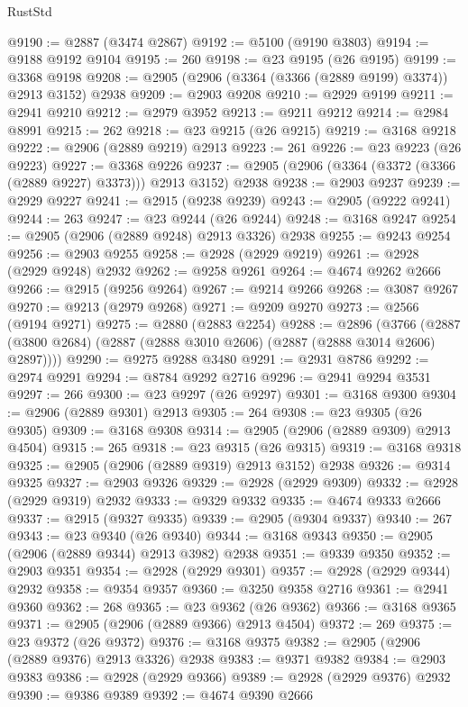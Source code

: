 \begin{lexlean}{RustStd}
\begin{coremodule}
{\begin{coremodule}
{{{{{{{{{{{{{{{{{{{{{{{{{{{{{{{{{{{{{{{{{{{{{{{{{{{{{{{{{{{{{{{{{{{{{{{{{{{{{{@9190 := @2887 (@3474 @2867)
@9192 := @5100 (@9190 @3803)
@9194 := @9188 @9192 @9104
@9195 := 260
@9198 := @23 @9195 (@26 @9195)
@9199 := @3368 @9198
@9208 := @2905 (@2906 (@3364 (@3366 (@2889 @9199) @3374)) @2913 @3152) @2938
@9209 := @2903 @9208
@9210 := @2929 @9199
@9211 := @2941 @9210
@9212 := @2979 @3952
@9213 := @9211 @9212
@9214 := @2984 @8991
@9215 := 262
@9218 := @23 @9215 (@26 @9215)
@9219 := @3168 @9218
@9222 := @2906 (@2889 @9219) @2913
@9223 := 261
@9226 := @23 @9223 (@26 @9223)
@9227 := @3368 @9226
@9237 := @2905 (@2906 (@3364 (@3372 (@3366 (@2889 @9227) @3373))) @2913 @3152) @2938
@9238 := @2903 @9237
@9239 := @2929 @9227
@9241 := @2915 (@9238 @9239)
@9243 := @2905 (@9222 @9241)
@9244 := 263
@9247 := @23 @9244 (@26 @9244)
@9248 := @3168 @9247
@9254 := @2905 (@2906 (@2889 @9248) @2913 @3326) @2938
@9255 := @9243 @9254
@9256 := @2903 @9255
@9258 := @2928 (@2929 @9219)
@9261 := @2928 (@2929 @9248) @2932
@9262 := @9258 @9261
@9264 := @4674 @9262 @2666
@9266 := @2915 (@9256 @9264)
@9267 := @9214 @9266
@9268 := @3087 @9267
@9270 := @9213 (@2979 @9268)
@9271 := @9209 @9270
@9273 := @2566 (@9194 @9271)
@9275 := @2880 (@2883 @2254)
@9288 := @2896
    (@3766 (@2887 (@3800 @2684) (@2887 (@2888 @3010 @2606) (@2887 (@2888 @3014 @2606) @2897))))
@9290 := @9275 @9288 @3480
@9291 := @2931 @8786
@9292 := @2974 @9291
@9294 := @8784 @9292 @2716
@9296 := @2941 @9294 @3531
@9297 := 266
@9300 := @23 @9297 (@26 @9297)
@9301 := @3168 @9300
@9304 := @2906 (@2889 @9301) @2913
@9305 := 264
@9308 := @23 @9305 (@26 @9305)
@9309 := @3168 @9308
@9314 := @2905 (@2906 (@2889 @9309) @2913 @4504)
@9315 := 265
@9318 := @23 @9315 (@26 @9315)
@9319 := @3168 @9318
@9325 := @2905 (@2906 (@2889 @9319) @2913 @3152) @2938
@9326 := @9314 @9325
@9327 := @2903 @9326
@9329 := @2928 (@2929 @9309)
@9332 := @2928 (@2929 @9319) @2932
@9333 := @9329 @9332
@9335 := @4674 @9333 @2666
@9337 := @2915 (@9327 @9335)
@9339 := @2905 (@9304 @9337)
@9340 := 267
@9343 := @23 @9340 (@26 @9340)
@9344 := @3168 @9343
@9350 := @2905 (@2906 (@2889 @9344) @2913 @3982) @2938
@9351 := @9339 @9350
@9352 := @2903 @9351
@9354 := @2928 (@2929 @9301)
@9357 := @2928 (@2929 @9344) @2932
@9358 := @9354 @9357
@9360 := @3250 @9358 @2716
@9361 := @2941 @9360
@9362 := 268
@9365 := @23 @9362 (@26 @9362)
@9366 := @3168 @9365
@9371 := @2905 (@2906 (@2889 @9366) @2913 @4504)
@9372 := 269
@9375 := @23 @9372 (@26 @9372)
@9376 := @3168 @9375
@9382 := @2905 (@2906 (@2889 @9376) @2913 @3326) @2938
@9383 := @9371 @9382
@9384 := @2903 @9383
@9386 := @2928 (@2929 @9366)
@9389 := @2928 (@2929 @9376) @2932
@9390 := @9386 @9389
@9392 := @4674 @9390 @2666
}}}}}}}}}}}}}}}}}}}}}}}}}}}}}}}}}}}}}}}}}}}}}}}}}}}}}}}}}}}}}}}}}}}}}}}}}}}}}}
\end{coremodule}}
\end{coremodule}
\end{lexlean}
